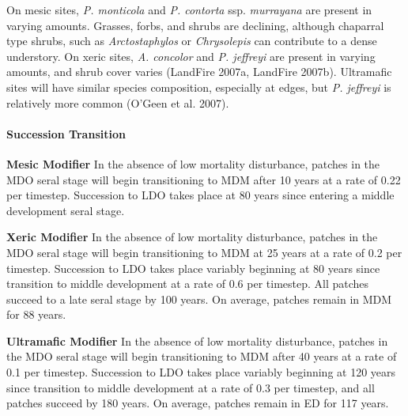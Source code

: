 On mesic sites, \emph{P. monticola} and \emph{P. contorta} ssp. \emph{murrayana} are present in varying amounts. Grasses, forbs, and shrubs are declining, although chaparral type shrubs, such as \emph{Arctostaphylos} or \emph{Chrysolepis} can contribute to a dense understory. On xeric sites, \emph{A. concolor} and \emph{P. jeffreyi} are present in varying amounts, and shrub cover varies (LandFire 2007a, LandFire 2007b). Ultramafic sites will have similar species composition, especially at edges, but \emph{P. jeffreyi} is relatively more common (O'Geen et al. 2007).


\paragraph{Succession Transition}
\begin{adjustwidth}{2cm}{}

\noindent \textbf{Mesic Modifier } In the absence of low mortality disturbance, patches in the MDO seral stage will begin transitioning to MDM after 10 years at a rate of 0.22 per timestep. Succession to LDO takes place at 80 years since entering a middle development seral stage. 

\medskip
\noindent \textbf{Xeric Modifier} In the absence of low mortality disturbance, patches in the MDO seral stage will begin transitioning to MDM at 25 years at a rate of 0.2 per timestep. Succession to LDO takes place variably beginning at 80 years since transition to middle development at a rate of 0.6 per timestep. All patches succeed to a late seral stage by 100 years. On average, patches remain in MDM for 88 years.

\medskip
\noindent \textbf{Ultramafic Modifier} In the absence of low mortality disturbance, patches in the MDO seral stage will begin transitioning to MDM after 40 years at a rate of 0.1 per timestep. Succession to LDO takes place variably beginning at 120 years since transition to middle development at a rate of 0.3 per timestep, and all patches succeed by 180 years. On average, patches remain in ED for 117 years.

\end{adjustwidth}

